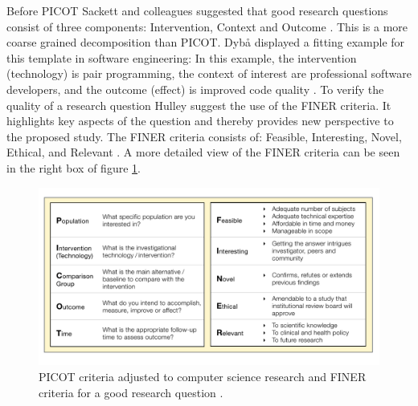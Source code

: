 Before PICOT Sackett and colleagues suggested that good research questions consist of three components: Intervention, Context and Outcome \cite{Sackett2000}. This is a more coarse grained decomposition than PICOT. Dyb{\aa} \etal displayed a fitting example for this template in software engineering:  \cite[p. 60]{Dyba2005} In this example, the intervention (technology) is pair programming, the context of interest are professional software developers, and the outcome (effect) is improved code quality \cite{Dyba2005}. To verify the quality of a research question Hulley \etal suggest the use of the FINER criteria. It highlights key aspects of the question and thereby provides new perspective to the proposed study. The FINER criteria consists of: Feasible, Interesting, Novel, Ethical, and Relevant \cite{Farrugia2009}. A more detailed view of the FINER criteria can be seen in the right box of figure \ref{fig:PICOT_FINER}.
\begin{figure}
	\centering
	\includegraphics[width=12cm]{figures/picot_finer.pdf}
	\caption{PICOT criteria adjusted to computer science research \cite{Farrugia2009} and FINER criteria for a good research question \cite{Farrugia2009}.}
	\label{fig:PICOT_FINER}
\end{figure}

